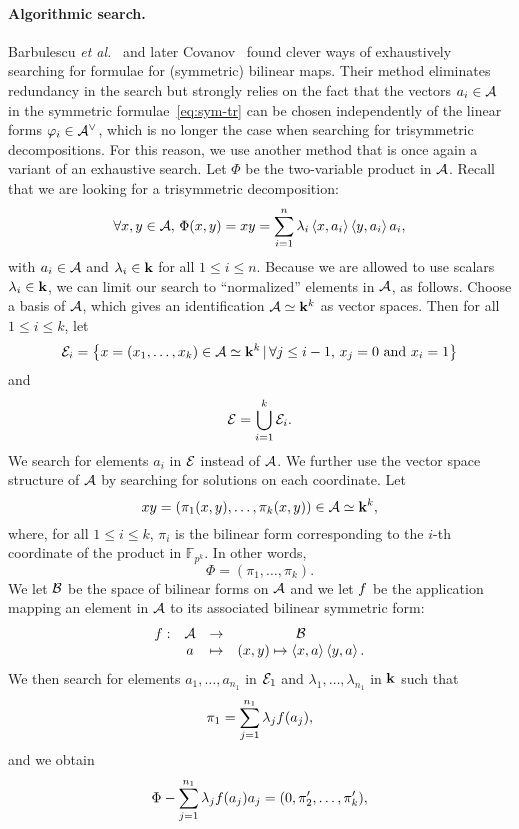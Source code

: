 \documentclass[11pt]{article}
\begin{document}
\paragraph{Algorithmic search.}
Barbulescu \emph{et al.}~\cite{BDEZ12} and later Covanov~\cite{Covanov19} found
clever ways of exhaustively searching for formulae for (symmetric) bilinear maps.
Their method eliminates redundancy in the search but strongly
relies on the fact that the vectors $a_i\in\mathcal{A}$ in 
the symmetric formulae~\eqref{eq:sym-tr} 
can be chosen independently of
the linear forms $\varphi_i\in\mathcal{A}^\vee$, which is no longer
the case when searching for trisymmetric decompositions. For this reason, we
use another method that is once again a variant of an exhaustive search. Let
$\Phi$ be the two-variable product in $\mathcal{A}$. Recall
that we are looking for a trisymmetric decomposition:
\[
  \forall x, y\in\mathcal{A},\,\Phi(x, y) = xy =
  \sum_{i=1}^{n}\lambda_i\left\langle x,a_i\right\rangle\left\langle y,a_i\right\rangle a_i,
\]
with $a_i\in\mathcal{A}$ and $\lambda_i\in\mathbf{k}$ for all $1\leq i
\leq n$. Because we are allowed to use scalars $\lambda_i\in\mathbf{k}$, we
can limit our search to ``normalized'' elements in $\mathcal{A}$, as follows. Choose
a basis of $\mathcal{A}$, which gives an identification $\mathcal{A}\simeq\mathbf{k}^k$ as vector spaces. Then for all
$1\leq i\leq k$, let
\[
  \mathcal{E}_i=\left\{ x=(x_1, \dots, x_k)\in\mathcal{A}\simeq\mathbf{k}^k
  \,|\, \forall j\leq i-1,\,x_j=0\text{ and }x_i=1 \right\}
\]
and
\[
  \mathcal{E} = \bigcup_{i=1}^k\mathcal{E}_i.
\]
We search for elements $a_i$ in $\mathcal{E}$ instead of $\mathcal{A}$. We further
use the vector space structure of $\mathcal{A}$ by searching for solutions
on each coordinate.
Let 
\[
  xy = (\pi_1(x, y), \dots, \pi_k(x, y))\in\mathcal{A}\simeq\mathbf{k}^k,
\]
where, for all $1\leq i\leq k$, $\pi_i$ is the bilinear form corresponding to
the $i$-th coordinate of the product in $\mathbb{F}_{p^k}$. In other words, 
\[
  \Phi = (\pi_1, \dots, \pi_k).
\]
We let $\mathcal{B}$ be the space of bilinear forms on $\mathcal{A}$ and we let $f$ be the
application mapping an element in $\mathcal{A}$ to its associated bilinear symmetric
form:
\[
\begin{array}{cccc}
  f: & \mathcal{A} & \to & \mathcal{B} \\
  & a & \mapsto & (x, y)\mapsto \left\langle x,a\right\rangle\left\langle y,a\right\rangle.
\end{array}
\]
We then search for elements $a_1, \dots, a_{n_1}$ in $\mathcal{E}_1$ and
$\lambda_1, \dots, \lambda_{n_1}$ in $\mathbf{k}$ such that 
\begin{equation}
  \pi_1 = \sum_{j=1}^{n_1}\lambda_jf(a_j),
  \label{eq:pi1}
\end{equation}
and we obtain
\[
  \Phi-\sum_{j=1}^{n_1}\lambda_jf(a_j)a_j = (0, \pi_2', \dots, \pi_k'), 
\]
\end{document}
